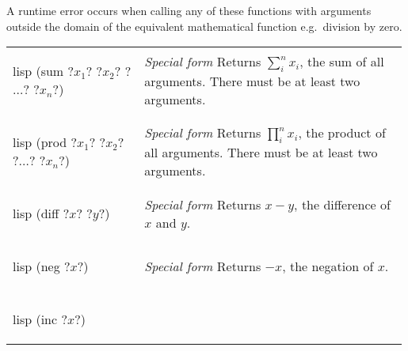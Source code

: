 \documentclass[a4paper, 12pt]{article}
\makeatletter
\newenvironment{funcdefs}
    {\begin{longtable}{@{} x{0.33\linewidth} @{} >{\raggedright\arraybackslash}p{0.66\linewidth} @{}}}
    {\end{longtable}}
\def\specialf/{\textit{Special form}\hspace{0.5em}}
\makeatother
\begin{document}
A runtime error occurs when calling any of these functions with arguments outside the domain of the equivalent mathematical function e.g.\ division by zero.

\begin{funcdefs}
    \begin{minipage}[t]{\linewidth}
        \centering
        \begin{cminted}[autogobble=true, escapeinside=??]{lisp}
            (sum ?$x_1$? ?$x_2$? ?$\ldots$? ?$x_n$?)
        \end{cminted}
    \end{minipage}
    & \specialf/ Returns $\sum_{i}^{n}{x_i}$, the sum of all arguments. There must be at least two arguments.
    \\ \\
    \begin{minipage}[t]{\linewidth}
        \centering
        \begin{cminted}[autogobble=true, escapeinside=??]{lisp}
            (prod ?$x_1$? ?$x_2$? ?$\ldots$? ?$x_n$?)
        \end{cminted}
    \end{minipage}
    & \specialf/ Returns $\prod_{i}^{n}{x_i}$, the product of all arguments. There must be at least two arguments.
    \\ \\
    \begin{minipage}[t]{\linewidth}
        \centering
        \begin{cminted}[autogobble=true, escapeinside=??]{lisp}
            (diff ?$x$? ?$y$?)
        \end{cminted}
    \end{minipage}
    & \specialf/ Returns $x - y$, the difference of $x$ and $y$.
    \\ \\
    \begin{minipage}[t]{\linewidth}
        \centering
        \begin{cminted}[autogobble=true, escapeinside=??]{lisp}
            (neg ?$x$?)
        \end{cminted}
    \end{minipage}
    & \specialf/ Returns $-x$, the negation of $x$.
    \\ \\
    \begin{minipage}[t]{\linewidth}
        \centering
        \begin{cminted}[autogobble=true, escapeinside=??]{lisp}
            (inc ?$x$?)

\end{cminted}
\end{minipage}
\end{funcdefs}
\end{document}
